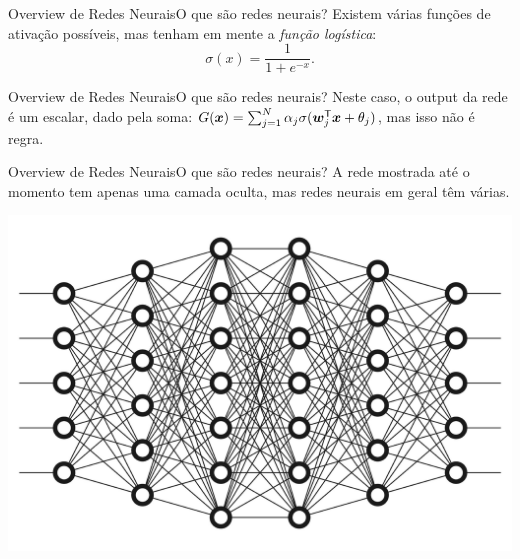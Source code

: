 \documentclass[13pt]{beamer}
\begin{document}
\begin{frame}{Overview de Redes Neurais}{O que são redes neurais?}
    \vspace{2pt}
    Existem várias funções de ativação possíveis, mas tenham em mente a \emph{função logística}:
    \begin{equation*}
        \sigma ( x ) = \frac{ 1 }{ 1 + e^{ -x } }
    .\end{equation*}
    \begin{center}
        
    \end{center}
\end{frame}

\begin{frame}{Overview de Redes Neurais}{O que são redes neurais?}
    \vspace{2pt}
    Neste caso, o output da rede é um escalar, dado pela soma:
    \(
        G ( \bm{x} ) = \sum_{ j=1 }^{ N } \alpha_{ j } \sigma ( \bm{w}_{ j }^{ \mathsf{T} } \bm{x} + \theta_{ j } )
        \),
    mas isso não é regra.
    \begin{center}
        
    \end{center}
\end{frame}

\begin{frame}{Overview de Redes Neurais}{O que são redes neurais?}
    \vspace{2pt}
    A rede mostrada até o momento tem apenas uma camada oculta, mas redes neurais em geral têm várias.
    \begin{center}
        \includegraphics[width=.7\textwidth]{../figuras/multi-layer-neural-network.jpeg}
    \end{center}
\end{frame}
\end{document}
